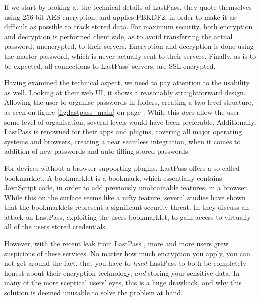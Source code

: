 			If we start by looking at the technical details of LastPass, they quote themselves using 256-bit AES encryption, and applies PBKDF2, in order to make it as difficult as possible to crack stored data. For maximum security, both encryption and decryption is performed client side\cite{lastpass_cleintsideencryption}, as to avoid transferring the actual password, unencrypted, to their servers. Encryption and decryption is done using the master password, which is never actually sent to their servers. Finally, as is to be expected, all connections to LastPass' servers, are SSL encrypted.

			Having examined the technical aspect, we need to pay attention to the usability as well. Looking at their web UI, it shows a reasonably straightforward design. Allowing the user to organise passwords in folders, creating a two-level structure, as seen on figure \ref{fig:lastpass_main} on page \pageref{fig:lastpass_main}. While this \emph{does} allow the user some level of organisation, several levels would have been preferable. Additionally, LastPass is renowned for their apps and plugins, covering all major operating systems and browsers, creating a near seamless integration, when it comes to addition of new passwords and auto-filling stored passwords.

			For devices without a browser supporting plugins, LastPass offers a so-called bookmarklet\cite{lastpass_bookmarklet}. A bookmarklet is a bookmark, which essentially contains JavaScript code, in order to add previously unobtainable features, in a browser. While this on the surface seems like a nifty feature, several studies have shown that the bookmarklets represent a significant security threat. In \cite{bookmarklet} they discuss an attack on LastPass, exploiting the users bookmarklet, to gain access to virtually all of the users stored credentials.

			However, with the recent leak from LastPass \cite{lastpass_leak}, more and more users grew suspicious of these services. No matter how much encryption you apply, you can not get around the fact, that you have to \emph{trust} LastPass to both be completely honest about their encryption technology, \emph{and} storing your sensitive data. In many of the more sceptical users' eyes, this is a huge drawback, and why this solution is deemed unusable to solve the problem at hand.


